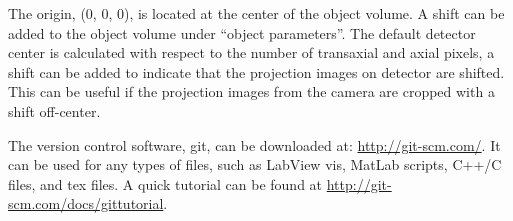 The origin, (0, 0, 0), is located at the center of the object volume.  A shift can be added to the object volume under ``object parameters''.  The default detector center is calculated with respect to the number of transaxial and axial pixels, a shift can be added to indicate that the projection images on detector are shifted.  This can be useful if the projection images from the camera are cropped with a shift off-center.

The version control software, git, can be downloaded at: \url{http://git-scm.com/}.  It can be used for any types of files, such as LabView vis, MatLab scripts, C++/C files, and tex files. A quick tutorial can be found at \url{http://git-scm.com/docs/gittutorial}.






